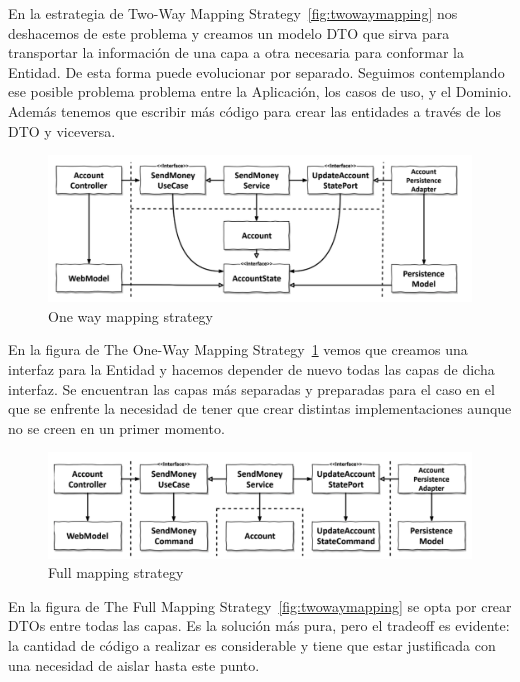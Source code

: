 En la estrategia de Two-Way Mapping Strategy~\cref{fig:twowaymapping} nos deshacemos de este problema y creamos un modelo DTO que sirva para transportar la información de una capa a otra necesaria para conformar la Entidad. De esta forma puede evolucionar por separado. Seguimos contemplando ese posible problema problema entre la Aplicación, los casos de uso, y el Dominio. Además tenemos que escribir más código para crear las entidades a través de los DTO y viceversa.

\begin{figure}[H]
    \centering
    \includegraphics[height=0.1\textheight]{./part/Ejecucion/Seguimiento/CreateTaskUseCase/img/onWaymapping}
    \caption{One way mapping strategy~\cite{TomHombergs2019GYHD}}\label{fig:onWaymapping}
\end{figure}

En la figura de The One-Way Mapping Strategy~\cref{fig:onWaymapping} vemos que creamos una interfaz para la Entidad y hacemos depender de nuevo todas las capas de dicha interfaz. Se encuentran las capas más separadas y preparadas para el caso en el que se enfrente la necesidad de tener que crear distintas implementaciones aunque no se creen en un primer momento.

\begin{figure}[H]
    \centering
    \includegraphics[height=0.1\textheight]{./part/Ejecucion/Seguimiento/CreateTaskUseCase/img/fullmapping}
    \caption{Full mapping strategy~\cite{TomHombergs2019GYHD}}\label{fig:fullmapping}
\end{figure}

En la figura de The Full Mapping Strategy~\cref{fig:twowaymapping} se opta por crear DTOs entre todas las capas. Es la solución más pura, pero el tradeoff es evidente: la cantidad de código a realizar es considerable y tiene que estar justificada con una necesidad de aislar hasta este punto.



